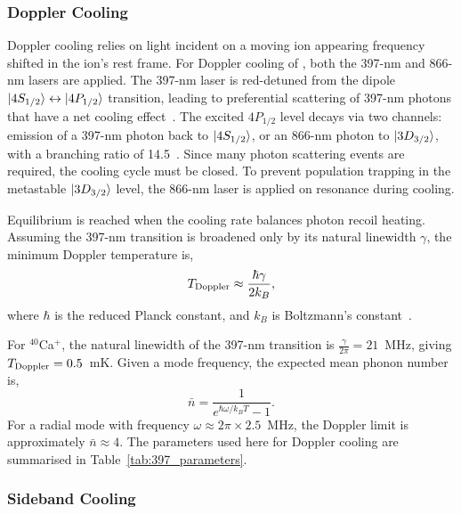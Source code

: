 \subsubsection{Doppler Cooling}

    Doppler cooling relies on light incident on a moving ion 
    appearing frequency shifted in the ion's rest frame. For Doppler cooling
    of \ca, both the 397-nm and 866-nm lasers are applied. The 397-nm laser is red-detuned from the dipole $\ket{4S_{1/2}}\leftrightarrow\ket{4P_{1/2}}$ transition, leading to preferential
    scattering of 397-nm photons that have a net cooling effect~\cite{wineland_laser_1979}. The excited $4P_{1/2}$ level decays via two channels: emission of a 397-nm photon back to $\ket{4S_{1/2}}$, or an 866-nm photon to $\ket{3D_{3/2}}$, with a branching
    ratio of 14.5~\cite{ramm_precision_2013}. Since many photon scattering events are required, the cooling cycle must be closed. To prevent population trapping in the metastable $\ket{3D_{3/2}}$ level, the 866-nm laser is applied on resonance during cooling.

    Equilibrium
    is reached when the cooling rate balances
    photon recoil heating. Assuming the 397-nm transition is broadened only by its natural linewidth $\gamma$, 
    the minimum Doppler temperature is,
    \begin{equation}
    T_{\rm Doppler} \approx \frac{\hbar\gamma}{2k_B},
    \end{equation}
    where $\hbar$ is the reduced Planck constant, and $k_B$ is Boltzmann's constant~\cite{wineland_laser_1979}.

     For
    $^{40}$Ca$^+$, the natural linewidth of the 397-nm transition is $\frac{\gamma}{2\pi} =
    21$~\unit{\MHz}\cite{morton_atomic_2003}, giving $T_{\rm Doppler} = 0.5$~\unit{\milli\kelvin}. 
    Given a mode frequency, the expected mean phonon number is,
    \begin{equation}
        \bar{n} = \frac{1}{e^{\hbar\omega/k_B T}-1}.
    \end{equation}
    For a radial mode with frequency $\omega \approx 2\pi\times2.5$~\unit{\MHz}, the Doppler limit is approximately
    $\bar{n} \approx 4$. 
    The parameters used here for Doppler cooling are summarised in Table~\ref{tab:397_parameters}. 


\subsubsection{Sideband Cooling}

